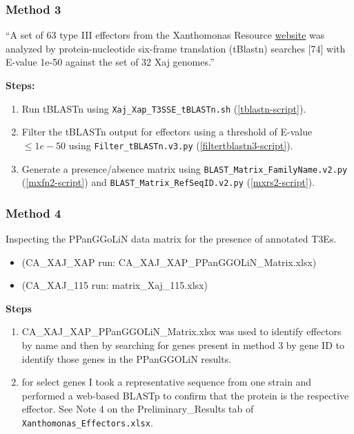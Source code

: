 \documentclass[
]{book}
\providecommand{\tightlist}{%
  \setlength{\itemsep}{0pt}\setlength{\parskip}{0pt}}
\begin{document}
\subsubsection{Method 3}\label{method-3}

\textbf{\citet{assis2021}}

``A set of 63 type III effectors from the Xanthomonas Resource \href{http://www.xanthomonas.org/tools.html}{website} was analyzed by protein-nucleotide six-frame translation (tBlastn) searches {[}74{]} with E-value 1e-50 against the set of 32 Xaj genomes.''

\textbf{Steps:}

\begin{enumerate}
\def\labelenumi{\arabic{enumi}.}
\tightlist
\item
  Run tBLASTn using \texttt{Xaj\_Xap\_T3SSE\_tBLASTn.sh} (\ref{tblastn-script}).
\item
  Filter the tBLASTn output for effectors using a threshold of E-value \(\leq 1e-50\) using \texttt{Filter\_tBLASTn.v3.py} (\ref{filtertblastn3-script}).
\item
  Generate a presence/absence matrix using \texttt{BLAST\_Matrix\_FamilyName.v2.py} (\ref{mxfn2-script}) and \texttt{BLAST\_Matrix\_RefSeqID.v2.py} (\ref{mxrs2-script}).
\end{enumerate}

\subsubsection{Method 4}\label{method-4}

Inspecting the PPanGGoLiN data matrix for the presence of annotated T3Es.

\begin{itemize}
\tightlist
\item
  (CA\_XAJ\_XAP run: CA\_XAJ\_XAP\_PPanGGOLiN\_Matrix.xlsx)
\item
  (CA\_XAJ\_115 run: matrix\_Xaj\_115.xlsx)
\end{itemize}

\textbf{Steps}

\begin{enumerate}
\def\labelenumi{\arabic{enumi}.}
\tightlist
\item
  CA\_XAJ\_XAP\_PPanGGOLiN\_Matrix.xlsx was used to identify effectors by name and then by searching for genes present in method 3 by gene ID to identify those genes in the PPanGGOLiN results.
\item
  for select genes I took a representative sequence from one strain and performed a web-based BLASTp to confirm that the protein is the respective effector. See Note 4 on the Preliminary\_Results tab of \texttt{Xanthomonas\_Effectors.xlsx}.
\end{enumerate}
\end{document}
